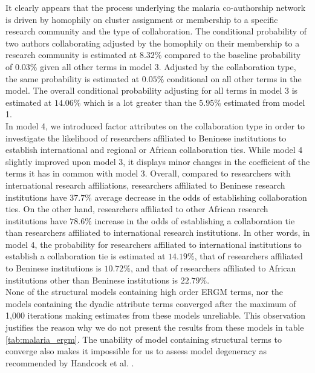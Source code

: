 It clearly appears that the process underlying the malaria co-authorship network is driven by homophily on cluster assignment or membership to a specific research community and the type of collaboration. The conditional probability of two authors collaborating adjusted by the homophily on their membership to a research community is estimated at $8.32\%$ compared to the baseline probability of $0.03\%$ given all other terms in model 3. Adjusted by the collaboration type, the same probability is estimated at $0.05\%$ conditional on all other terms in the model. The overall conditional probability adjusting for all terms in model 3 is estimated at $14.06\%$ which is a lot greater than the $5.95\%$ estimated from model 1.\\
In model 4, we introduced  factor attributes on the collaboration type in order to investigate the likelihood of researchers affiliated to Beninese institutions to establish international and regional or African collaboration ties. While model 4 slightly improved upon model 3, it displays minor changes in the coefficient of the terms it has in common with model 3. Overall, compared to researchers with international research affiliations, researchers affiliated to Beninese research institutions have $37.7\%$ average decrease in the odds of establishing collaboration ties. On the other hand, researchers affiliated to other African research institutions have $78.6\%$ increase in the odds of establishing a collaboration tie than researchers affiliated to international research institutions. In other words, in model 4, the probability for researchers affiliated to international institutions to establish a collaboration tie is estimated at $14.19\%$, that of researchers affiliated to Beninese institutions is $10.72\%$, and that of researchers affiliated to African institutions other than Beninese institutions is $22.79\%$. \\
None of the structural models containing high order ERGM terms, nor the models containing the dyadic attribute terms converged after the maximum of 1,000 iterations making estimates from these models unreliable. This observation justifies the reason why we do not present the results from these models in table \ref{tab:malaria_ergm}. The unability of model containing structural terms to converge also makes it impossible for us to assess model degeneracy as recommended by Handcock et al. \cite{handcock_assessing_2003}.

